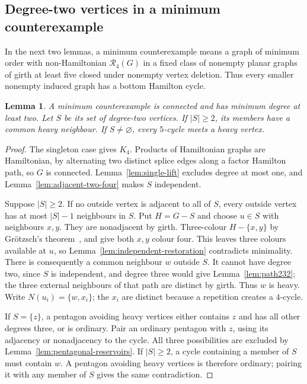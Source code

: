 \documentclass[11pt]{article}
\newtheorem{lemma}[theorem]{Lemma}
\theoremstyle{remark}
\newcommand{\R}{\mathcal R}
\numberwithin{equation}{section}
\numberwithin{table}{section}
\begin{document}
\subsection{Degree-two vertices in a minimum counterexample}

In the next two lemmas, a minimum counterexample means a graph of minimum
order with non-Hamiltonian $\R_4(G)$ in a fixed class of nonempty planar
graphs of girth at least five closed under nonempty vertex deletion.
Thus every smaller nonempty induced graph has a bottom Hamilton cycle.

\begin{lemma}\label{lem:degree-two-counterexample}
A minimum counterexample is connected and has minimum degree at least two.
Let $S$ be its set of degree-two vertices. If $|S|\ge2$, its members have
a common heavy neighbour. If $S\ne\varnothing$, every $5$-cycle meets a
heavy vertex.
\end{lemma}
\begin{proof}
The singleton case gives $K_4$. Products of Hamiltonian graphs are
Hamiltonian, by alternating two distinct splice edges along a factor
Hamilton path, so $G$ is connected. Lemma~\ref{lem:single-lift} excludes
degree at most one, and Lemma~\ref{lem:adjacent-two-four} makes $S$
independent.

Suppose $|S|\ge2$. If no outside vertex is adjacent to all of $S$, every
outside vertex has at most $|S|-1$ neighbours in $S$. Put $H=G-S$ and
choose $u\in S$ with neighbours $x,y$. They are nonadjacent by girth.
Three-colour $H-\{x,y\}$ by Gr\"otzsch's theorem~\cite{Grotzsch59}, and
give both $x,y$ colour four. This leaves three colours available at $u$,
so Lemma~\ref{lem:independent-restoration} contradicts minimality.
There is consequently a common neighbour $w$ outside $S$. It cannot have
degree two, since $S$ is independent, and degree three would give
Lemma~\ref{lem:path232}; the three external neighbours of that path
are distinct by girth. Thus $w$ is heavy. Write $N(u_i)=\{w,x_i\}$; the $x_i$ are distinct
because a repetition creates a $4$-cycle.

If $S=\{z\}$, a pentagon avoiding heavy vertices either contains $z$
and has all other degrees three, or is ordinary. Pair an ordinary pentagon
with $z$, using its adjacency or nonadjacency to the cycle. All three
possibilities are excluded by Lemma~\ref{lem:pentagonal-reservoirs}.
If $|S|\ge2$, a cycle containing a member of $S$ must contain $w$.
A pentagon avoiding heavy vertices is therefore ordinary; pairing it with
any member of $S$ gives the same contradiction.
\end{proof}
\end{document}
